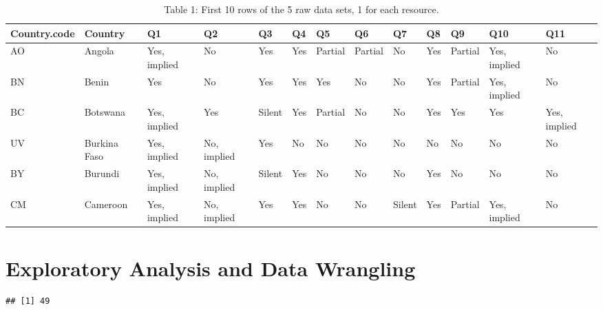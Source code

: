\documentclass[
  12pt,
]{article}
\newenvironment{Shaded}{\begin{snugshade}}{\end{snugshade}}
\newcommand{\KeywordTok}[1]{\textcolor[rgb]{0.13,0.29,0.53}{\textbf{#1}}}
\newcommand{\NormalTok}[1]{#1}
\newcommand{\OperatorTok}[1]{\textcolor[rgb]{0.81,0.36,0.00}{\textbf{#1}}}
\begin{document}
\begin{table}

\caption{\label{tab:unnamed-chunk-1}Table 1: First 10 rows of the 5 raw data sets, 1 for each resource.}
\centering
\begin{tabular}[t]{l|l|>{}l|>{}l|>{}l|>{}l|>{}l|>{}l|>{}l|>{}l|>{}l|>{}l|>{}l}
\hline
Country.code & Country & Q1 & Q2 & Q3 & Q4 & Q5 & Q6 & Q7 & Q8 & Q9 & Q10 & Q11\\
\hline
AO & Angola & Yes, implied & No & Yes & Yes & Partial & Partial & No & Yes & Partial & Yes, implied & No\\
\hline
BN & Benin & Yes & No & Yes & Yes & Yes & No & No & Yes & Partial & Yes, implied & No\\
\hline
BC & Botswana & Yes, implied & Yes & Silent & Yes & Partial & No & No & Yes & Yes & Yes & Yes, implied\\
\hline
UV & Burkina Faso & Yes, implied & No, implied & Yes & No & No & No & No & No & No & No & No\\
\hline
BY & Burundi & Yes, implied & No, implied & Silent & Yes & No & No & No & Yes & No & No & No\\
\hline
CM & Cameroon & Yes, implied & No, implied & Yes & Yes & No & No & Silent & Yes & Partial & Yes, implied & No\\
\hline
\end{tabular}
\end{table}

\newpage

\hypertarget{exploratory-analysis-and-data-wrangling}{%
\section{Exploratory Analysis and Data
Wrangling}\label{exploratory-analysis-and-data-wrangling}}

\begin{Shaded}
\end{Shaded}

\begin{verbatim}
## [1] 49
\end{verbatim}

\begin{Shaded}
\end{Shaded}
\end{document}
